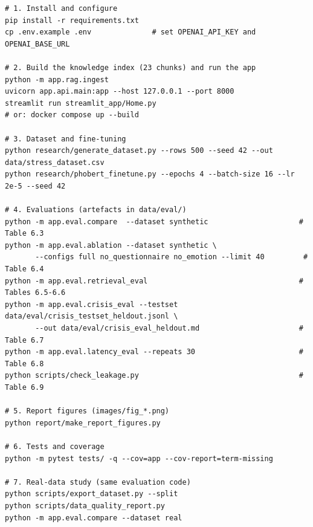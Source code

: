 \begin{lstlisting}[caption={Commands that regenerate every result in Chapter~\ref{ch:result}.}, label={lst:repro}]
# 1. Install and configure
pip install -r requirements.txt
cp .env.example .env              # set OPENAI_API_KEY and OPENAI_BASE_URL

# 2. Build the knowledge index (23 chunks) and run the app
python -m app.rag.ingest
uvicorn app.api.main:app --host 127.0.0.1 --port 8000
streamlit run streamlit_app/Home.py
# or: docker compose up --build

# 3. Dataset and fine-tuning
python research/generate_dataset.py --rows 500 --seed 42 --out data/stress_dataset.csv
python research/phobert_finetune.py --epochs 4 --batch-size 16 --lr 2e-5 --seed 42

# 4. Evaluations (artefacts in data/eval/)
python -m app.eval.compare  --dataset synthetic                     # Table 6.3
python -m app.eval.ablation --dataset synthetic \
       --configs full no_questionnaire no_emotion --limit 40         # Table 6.4
python -m app.eval.retrieval_eval                                   # Tables 6.5-6.6
python -m app.eval.crisis_eval --testset data/eval/crisis_testset_heldout.jsonl \
       --out data/eval/crisis_eval_heldout.md                       # Table 6.7
python -m app.eval.latency_eval --repeats 30                        # Table 6.8
python scripts/check_leakage.py                                     # Table 6.9

# 5. Report figures (images/fig_*.png)
python report/make_report_figures.py

# 6. Tests and coverage
python -m pytest tests/ -q --cov=app --cov-report=term-missing

# 7. Real-data study (same evaluation code)
python scripts/export_dataset.py --split
python scripts/data_quality_report.py
python -m app.eval.compare --dataset real
\end{lstlisting}
